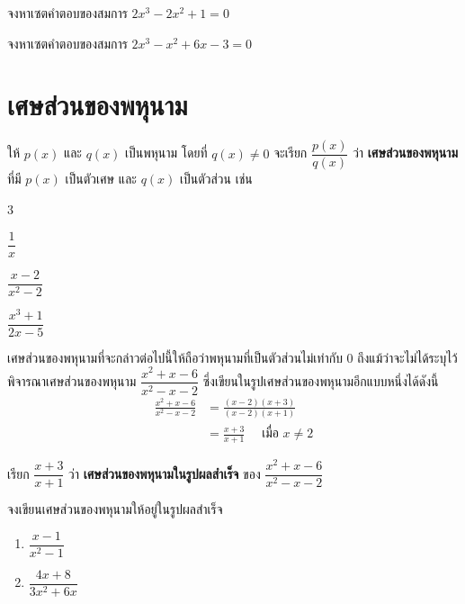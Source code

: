 \begin{examplebox}
	จงหาเซตคำตอบของสมการ $2x^3 - 2x^2 + 1 = 0$
\end{examplebox}
\solution
\newpage

\begin{examplebox}
	จงหาเซตคำตอบของสมการ $2x^3 - x^2 + 6x - 3 = 0$
\end{examplebox}
\solution

\newpage
\section{เศษส่วนของพหุนาม}
ให้ $p(x)$ และ $q(x)$ เป็นพหุนาม โดยที่ $q(x) \neq 0$ จะเรียก $\dfrac{p(x)}{q(x)}$ ว่า \textbf{เศษส่วนของพหุนาม} ที่มี $p(x)$ เป็นตัวเศษ และ $q(x)$ เป็นตัวส่วน เช่น
\begin{enumerate}[label=\arabic*., leftmargin=2.5em]
	\begin{multicols}{3}
		\item $\dfrac{1}{x}$ 
		\item $\dfrac{x-2}{x^{2}-2}$
		\item $\dfrac{x^{3}+1}{2 x-5}$ 
	\end{multicols}
\end{enumerate}

\remark เศษส่วนของพหุนามที่จะกล่าวต่อไปนี้ให้ถือว่าพหุนามที่เป็นตัวส่วนไม่เท่ากับ $0$ ถึงแม้ว่าจะไม่ได้ระบุไว้\\ 
พิจารณาเศษส่วนของพหุนาม $\dfrac{x^{2}+x-6}{x^{2}-x-2}$ ซึ่งเขียนในรูปเศษส่วนของพหุนามอีกแบบหนึ่งได้ดังนี้
\begin{align*}
	\frac{x^{2}+x-6}{x^{2}-x-2} & =\frac{(x-2)(x+3)}{(x-2)(x+1)} \\
	& =\frac{x+3}{x+1} \quad \text { เมื่อ } x \neq 2   
\end{align*}

เรียก $\dfrac{x+3}{x+1}$ ว่า \textbf{เศษส่วนของพหุนามในรูปผลสำเร็จ} ของ $\dfrac{x^{2}+x-6}{x^{2}-x-2}$   

\newpage
\begin{examplebox}
	จงเขียนเศษส่วนของพหุนามให้อยู่ในรูปผลสำเร็จ
	\begin{enumerate}[label=\arabic*), leftmargin=2.5em]
		\item 	$\dfrac{x-1}{x^2-1}$
		\item $\dfrac{4x+8}{3x^2+6x}$
	\end{enumerate}  
\end{examplebox}
\solution

\newpage
